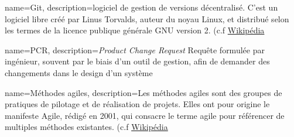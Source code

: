 {
	name=Git,
	description={logiciel de gestion de versions décentralisé. C'est un logiciel libre créé par Linus Torvalds, auteur du noyau Linux, et distribué selon les termes de la licence publique générale GNU version 2.  (c.f \href{https://fr.wikipedia.org/wiki/Git}{Wikipédia}}
}

{
	name=PCR,
	description={\textit{Product Change Request} Requête formulée par ingénieur, souvent par le biais d'un outil de gestion, afin de demander des changements dans le design d'un système}
}

{
	name=Méthodes agiles,
	description={Les méthodes agiles sont des groupes de pratiques de pilotage et de réalisation de projets. Elles ont pour origine le manifeste Agile, rédigé en 2001, qui consacre le terme agile pour référencer de multiples méthodes existantes. (c.f \href{https://fr.wikipedia.org/wiki/Méthode_agile}{Wikipédia}}
}
\glsaddall